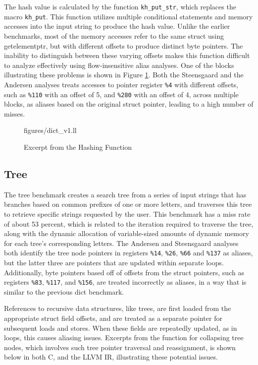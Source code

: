 The hash value is calculated by the function \texttt{kh\_put\_str}, which replaces the macro \texttt{kh\_put}. This function utilizes multiple conditional statements and memory accesses into the input string to produce the hash value. Unlike the earlier benchmarks, most of the memory accesses refer to the same struct using getelementptr, but with different offsets to produce distinct byte pointers. The inability to distinguish between these varying offsets makes this function difficult to analyze effectively using flow-insensitive alias analyses. One of the blocks illustrating these problems is shown in Figure \ref{fig:dictll2}. Both the Steensgaard and the Andersen analyses treats accesses to pointer register \texttt{\%4} with different offsets, such as \texttt{\%110} with an offset of 5, and \texttt{\%280} with an offset of 4, across multiple blocks, as aliases based on the original struct pointer, leading to a high number of misses.

\begin{figure} [h]
   {figures/dict_v1.ll}
  \caption{Excerpt from the Hashing Function}
  \label{fig:dictll2}
\end{figure}

\subsection{Tree}
The tree benchmark creates a search tree from a series of input strings that has branches based on common prefixes of one or more letters, and traverses this tree to retrieve specific strings requested by the user. This benchmark has a miss rate of about 53 percent, which is related to the iteration required to traverse the tree, along with the dynamic allocation of variable-sized amounts of dynamic memory for each tree's corresponding letters. The Andersen and Steensgaard analyses both identify the tree node pointers in registers \texttt{\%14}, \texttt{\%26}, \texttt{\%66} and \texttt{\%137} as aliases, but the latter three are pointers that are updated within separate loops. Additionally, byte pointers based off of offsets from the struct pointers, such as registers \texttt{\%83}, \texttt{\%117}, and \texttt{\%156}, are treated incorrectly as aliases, in a way that is similar to the previous dict benchmark.

References to recursive data structures, like trees, are first loaded from the appropriate struct field offsets, and are treated as a separate pointer for subsequent loads and stores. When these fields are repeatedly updated, as in loops, this causes aliasing issues. Excerpts from the function for collapsing tree nodes, which involves such tree pointer traversal and reassignment, is shown below in both C, and the LLVM IR, illustrating these potential issues.

